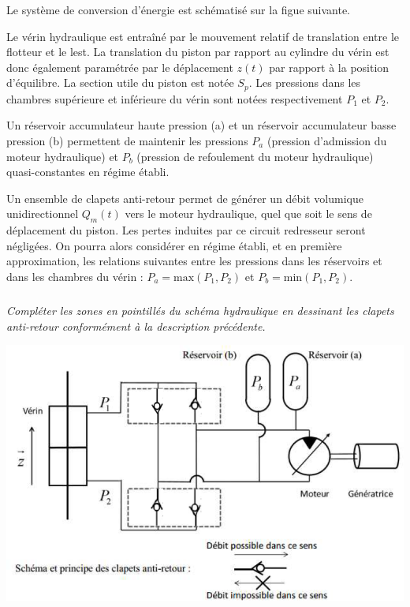 \documentclass[10pt,fleqn]{article} %
\begin{document}
\begin{multicols}{2}
Le système de conversion d'énergie est schématisé sur la figue suivante.

Le vérin hydraulique est entraîné par le mouvement relatif de translation entre le flotteur et le lest.
La translation du piston par rapport au cylindre du vérin est donc également paramétrée par le
déplacement $z(t)$ par rapport à la position d’équilibre. La section utile du piston est notée $S_p$. Les
pressions dans les chambres supérieure et inférieure du vérin sont notées respectivement $P_1$ et $P_2$.

Un réservoir accumulateur haute pression (a) et un réservoir accumulateur basse pression (b)
permettent de maintenir les pressions $P_a$ (pression d'admission du moteur hydraulique) et $P_b$
(pression de refoulement du moteur hydraulique) quasi-constantes en régime établi.

Un ensemble de clapets anti-retour permet de générer un débit volumique unidirectionnel $Q_m(t)$
vers le moteur hydraulique, quel que soit le sens de déplacement du piston. Les pertes induites par
ce circuit redresseur seront négligées. On pourra alors considérer en régime établi, et en première
approximation, les relations suivantes entre les pressions dans les réservoirs et dans les chambres du
vérin : $P_a = \text{max} \left(P_1,P_2\right)$ et $P_b = \text{min} \left(P_1,P_2\right)$.

\fi


\subparagraph{}\textit{Compléter les zones en pointillés du schéma hydraulique en dessinant
les clapets anti-retour conformément à la description précédente.}
\ifprof
\begin{corrige}
\begin{center}
\includegraphics[width=.5\linewidth]{images/cor_03}
\end{center}
\end{corrige}
\else



\end{multicols}
\end{document}

